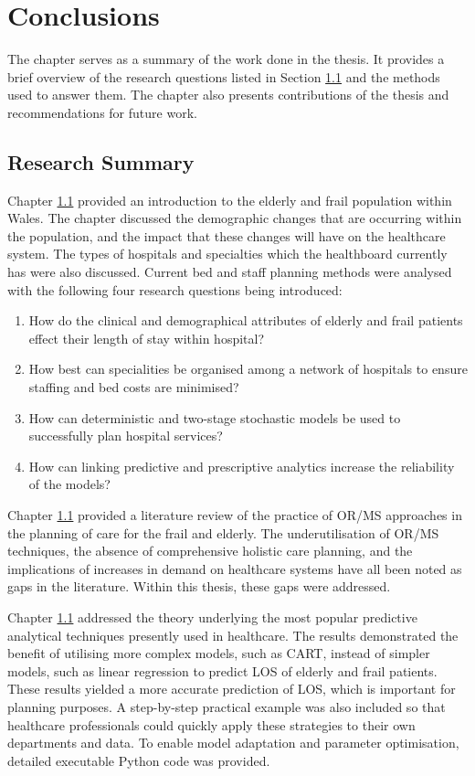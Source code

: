 \documentclass[../thesis.tex]{subfiles}
\begin{document}
\chapter{Conclusions}\label{chp:Discussion}
\onehalfspacing
The chapter serves as a summary of the work done in the thesis. It provides a brief overview of the research questions listed in Section \ref{} and the methods used to answer them. The chapter also  presents contributions of the thesis and recommendations for future work.


\section{Research Summary}
Chapter \ref{} provided an introduction to the elderly and frail population within Wales. The chapter discussed the demographic changes that are occurring within the population, and the impact that these changes will have on the healthcare system. The types of hospitals and specialties which the healthboard currently has were also discussed. Current bed and staff planning methods were analysed with the following four research questions being introduced:


\begin{enumerate}
     \item How do the clinical and demographical attributes of elderly and frail patients effect their length of stay within hospital?
     \item How best can specialities be organised among a network of hospitals to ensure staffing and bed costs are minimised? %
     \item How can deterministic and two-stage stochastic models be used to successfully plan hospital services?
     \item How can linking predictive and prescriptive analytics increase the reliability of the models?
\end{enumerate}

Chapter \ref{} provided a literature review of the practice of OR/MS approaches in the planning of care for the frail and elderly. The underutilisation of OR/MS techniques, the absence of comprehensive holistic care planning, and the implications of increases in demand on healthcare systems have all been noted as gaps in the literature. Within this thesis, these gaps were addressed.

Chapter \ref{} addressed the theory underlying the most popular predictive analytical techniques presently used in healthcare. The results demonstrated the benefit of utilising more complex models, such as CART, instead of simpler models, such as linear regression to predict LOS of elderly and frail patients. These results yielded a more accurate prediction of LOS, which is important for planning purposes. A step-by-step practical example was also included so that healthcare professionals could quickly apply these strategies to their own departments and data. To enable model adaptation and parameter optimisation, detailed executable Python code was provided.
\end{document}

